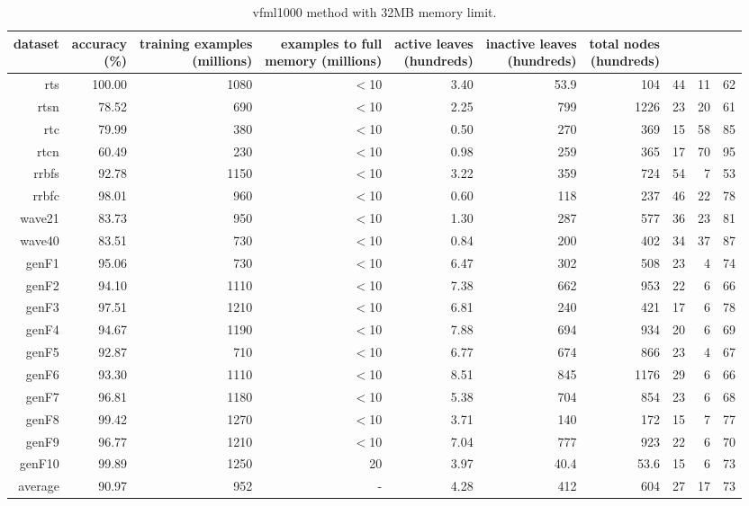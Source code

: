 \clearpage
\begin{table}
\caption{{\sc vfml1000} method with 32MB memory limit.}
\label{tab:vfml1000-32MB}
\centering
\begin{tabular}{|r|r|r|r|r|r|r|r|r|r|}
\hline
dataset	&
\rotatebox{90}{\parbox{9em}{accuracy\\(\%)}} &
\rotatebox{90}{\parbox{9em}{training examples\\(millions)}} &
\rotatebox{90}{\parbox{9em}{examples to full\\memory (millions)}} &
\rotatebox{90}{\parbox{9em}{active leaves\\(hundreds)}} &
\rotatebox{90}{\parbox{9em}{inactive leaves\\(hundreds)}} &
\rotatebox{90}{\parbox{9em}{total nodes\\(hundreds)}} &
\rotatebox{90}{\parbox{9em}{tree depth}}	&
\rotatebox{90}{\parbox{9em}{training speed (\%)}} &
\rotatebox{90}{\parbox{9em}{prediction speed (\%)}} \\
\hline
{\sc rts} & 100.00 & 1080 & $<$10 & 3.40 & 53.9 & 104 & 44 & 11 & 62 \\
{\sc rtsn} & 78.52 & 690 & $<$10 & 2.25 & 799 & 1226 & 23 & 20 & 61 \\
{\sc rtc} & 79.99 & 380 & $<$10 & 0.50 & 270 & 369 & 15 & 58 & 85 \\
{\sc rtcn} & 60.49 & 230 & $<$10 & 0.98 & 259 & 365 & 17 & 70 & 95 \\
{\sc rrbfs} & 92.78 & 1150 & $<$10 & 3.22 & 359 & 724 & 54 & 7 & 53 \\
{\sc rrbfc} & 98.01 & 960 & $<$10 & 0.60 & 118 & 237 & 46 & 22 & 78 \\
{\sc wave21} & 83.73 & 950 & $<$10 & 1.30 & 287 & 577 & 36 & 23 & 81 \\
{\sc wave40} & 83.51 & 730 & $<$10 & 0.84 & 200 & 402 & 34 & 37 & 87 \\
{\sc genF1} & 95.06 & 730 & $<$10 & 6.47 & 302 & 508 & 23 & 4 & 74 \\
{\sc genF2} & 94.10 & 1110 & $<$10 & 7.38 & 662 & 953 & 22 & 6 & 66 \\
{\sc genF3} & 97.51 & 1210 & $<$10 & 6.81 & 240 & 421 & 17 & 6 & 78 \\
{\sc genF4} & 94.67 & 1190 & $<$10 & 7.88 & 694 & 934 & 20 & 6 & 69 \\
{\sc genF5} & 92.87 & 710 & $<$10 & 6.77 & 674 & 866 & 23 & 4 & 67 \\
{\sc genF6} & 93.30 & 1110 & $<$10 & 8.51 & 845 & 1176 & 29 & 6 & 66 \\
{\sc genF7} & 96.81 & 1180 & $<$10 & 5.38 & 704 & 854 & 23 & 6 & 68 \\
{\sc genF8} & 99.42 & 1270 & $<$10 & 3.71 & 140 & 172 & 15 & 7 & 77 \\
{\sc genF9} & 96.77 & 1210 & $<$10 & 7.04 & 777 & 923 & 22 & 6 & 70 \\
{\sc genF10} & 99.89 & 1250 & 20 & 3.97 & 40.4 & 53.6 & 15 & 6 & 73 \\
\hline
average & 90.97 & 952 &  -  & 4.28 & 412 & 604 & 27 & 17 & 73 \\
\hline
\end{tabular}
\end{table}
